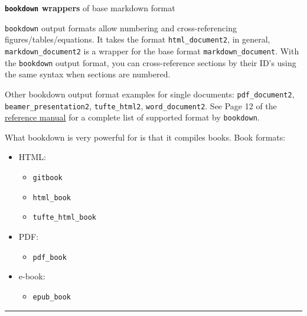 \documentclass[
  a4paper,
  twoside,
  openright]{book}
\providecommand{\tightlist}{%
  \setlength{\itemsep}{0pt}\setlength{\parskip}{0pt}}
\theoremstyle{definition}
\theoremstyle{definition}
\theoremstyle{definition}
\theoremstyle{definition}
\theoremstyle{remark}
\begin{document}
\textbf{\texttt{bookdown} wrappers} of base markdown format

{\texttt{bookdown} output formats} allow numbering and cross-referencing figures/tables/equations. It takes the format \texttt{html\_document2}, in general, \texttt{markdown\_document2} is a wrapper for the base format \texttt{markdown\_document}. With the \texttt{bookdown} output format, you can cross-reference sections by their ID's using the same syntax when sections are numbered.

Other bookdown output format examples for single documents: \texttt{pdf\_document2}, \texttt{beamer\_presentation2}, \texttt{tufte\_html2}, \texttt{word\_document2}. See Page 12 of the \href{https://cran.r-project.org/web/packages/bookdown/bookdown.pdf}{reference manual} for a complete list of supported format by \texttt{bookdown}.

What bookdown is very powerful for is that it compiles books. Book formats:

\begin{itemize}
\tightlist
\item
  HTML:

  \begin{itemize}
  \tightlist
  \item
    \texttt{gitbook}
  \item
    \texttt{html\_book}
  \item
    \texttt{tufte\_html\_book}
  \end{itemize}
\item
  PDF:

  \begin{itemize}
  \tightlist
  \item
    \texttt{pdf\_book}
  \end{itemize}
\item
  e-book:

  \begin{itemize}
  \tightlist
  \item
    \texttt{epub\_book}
  \end{itemize}
\end{itemize}

\begin{center}\rule{0.5\linewidth}{0.5pt}\end{center}
\end{document}
